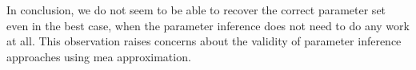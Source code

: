 
In conclusion, we do not seem to be able to recover the correct parameter set even in the best case, when the parameter inference does not need to do any work at all. 
This observation raises concerns about the validity of parameter inference approaches using \gls{mea} approximation. 
